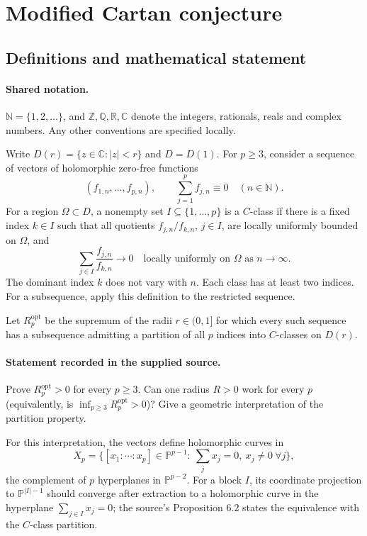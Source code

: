 \documentclass[11pt]{article}
\begin{document}
\section{Modified Cartan conjecture}\label{statement}

\subsection{Definitions and mathematical statement}

\paragraph{Shared notation.}$\mathbb N=\{1,2,\ldots\}$, and $\mathbb Z,\mathbb Q,\mathbb R,\mathbb C$ denote the integers, rationals, reals and complex numbers. Any other conventions are specified locally.


Write $D(r)=\{z\in\mathbb C:|z|<r\}$ and $D=D(1)$. For $p\ge3$, consider a sequence of vectors of holomorphic zero-free functions
\[
 (f_{1,n},\ldots,f_{p,n}),\qquad \sum_{j=1}^{p}f_{j,n}\equiv0\quad(n\in\mathbb N).
\]
For a region $\Omega\subset D$, a nonempty set $I\subseteq\{1,\ldots,p\}$ is a $C$-class if there is a fixed index $k\in I$ such that all quotients $f_{j,n}/f_{k,n}$, $j\in I$, are locally uniformly bounded on $\Omega$, and
\[
 \sum_{j\in I}\frac{f_{j,n}}{f_{k,n}}\longrightarrow0
 \quad\text{locally uniformly on }\Omega\text{ as }n\to\infty.
\]
The dominant index $k$ does not vary with $n$. Each class has at least two indices. For a subsequence, apply this definition to the restricted sequence.

Let $R_p^{\mathrm{opt}}$ be the supremum of the radii $r\in(0,1]$ for which every such sequence has a subsequence admitting a partition of all $p$ indices into $C$-classes on $D(r)$.
\paragraph{Statement recorded in the supplied source.}
Prove $R_p^{\mathrm{opt}}>0$ for every $p\ge3$. Can one radius $R>0$ work for every $p$ (equivalently, is $\inf_{p\ge3}R_p^{\mathrm{opt}}>0$)? Give a geometric interpretation of the partition property.

For this interpretation, the vectors define holomorphic curves in
\[
 X_p=\{[x_1:\cdots:x_p]\in\mathbb P^{p-1}:\ \sum_jx_j=0,\ x_j\ne0\ \forall j\},
\]
the complement of $p$ hyperplanes in $\mathbb P^{p-2}$. For a block $I$, its coordinate projection to $\mathbb P^{|I|-1}$ should converge after extraction to a holomorphic curve in the hyperplane $\sum_{j\in I}x_j=0$; the source's Proposition 6.2 states the equivalence with the $C$-class partition.
\end{document}

